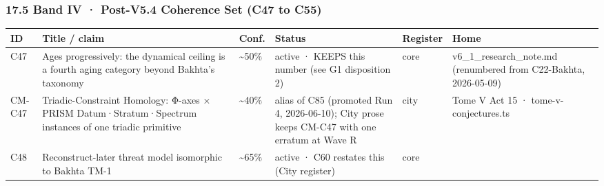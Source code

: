 \documentclass[
]{article}
\newcounter{none} %
\begin{document}
\subsubsection{17.5 Band IV · Post-V5.4 Coherence Set (C47 to
C55)}\label{band-iv-post-v5.4-coherence-set-c47-to-c55}

{\def\LTcaptype{none} %
\begin{longtable}[]{@{}
  >{\raggedright\arraybackslash}p{}
  >{\raggedright\arraybackslash}p{}
  >{\raggedright\arraybackslash}p{}
  >{\raggedright\arraybackslash}p{}
  >{\raggedright\arraybackslash}p{}
  >{\raggedright\arraybackslash}p{}@{}}
\toprule\noalign{}
\begin{minipage}[b]{\linewidth}\raggedright
ID
\end{minipage} & \begin{minipage}[b]{\linewidth}\raggedright
Title / claim
\end{minipage} & \begin{minipage}[b]{\linewidth}\raggedright
Conf.
\end{minipage} & \begin{minipage}[b]{\linewidth}\raggedright
Status
\end{minipage} & \begin{minipage}[b]{\linewidth}\raggedright
Register
\end{minipage} & \begin{minipage}[b]{\linewidth}\raggedright
Home
\end{minipage} \\
\midrule\noalign{}
\endhead
\bottomrule\noalign{}
\endlastfoot
C47 & Ages progressively: the dynamical ceiling is a fourth aging
category beyond Bakhta's taxonomy & \textasciitilde50\% & active · KEEPS
this number (see G1 disposition 2) & core & v6\_1\_research\_note.md
(renumbered from C22-Bakhta, 2026-05-09) \\
CM-C47 & Triadic-Constraint Homology: Φ-axes × PRISM
Datum·Stratum·Spectrum instances of one triadic primitive &
\textasciitilde40\% & alias of C85 (promoted Run 4, 2026-06-10); City
prose keeps CM-C47 with one erratum at Wave R & city & Tome V Act 15 ·
tome-v-conjectures.ts \\
C48 & Reconstruct-later threat model isomorphic to Bakhta TM-1 &
\textasciitilde65\% & active · C60 restates this (City register) & core

\end{longtable}}
\end{document}
